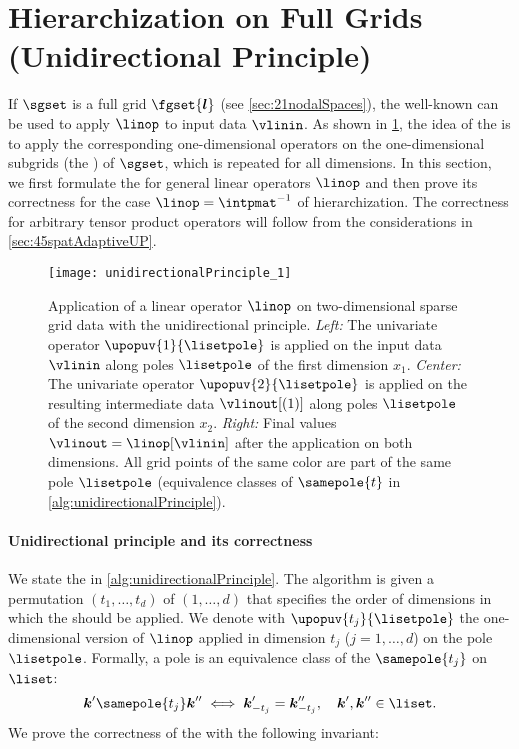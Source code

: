 \section{Hierarchization on Full Grids (Unidirectional Principle)}
\label{sec:42fullGrids}

If $\sgset$ is a full grid $\fgset{\*l}$
(see \cref{sec:21nodalSpaces}),
the well-known \up
can be used to apply $\linop$ to input data $\vlinin$.
As shown in \cref{fig:unidirectionalPrinciple}, the idea of the \up
is to apply the corresponding one-dimensional operators on the
one-dimensional subgrids (the ) of $\sgset$,
which is repeated for all dimensions.
In this section, we first formulate the \up for
general linear operators $\linop$ and then prove its correctness for
the case $\linop = \intpmatinv$ of hierarchization.
The correctness for arbitrary tensor product operators
will follow from the considerations in \cref{sec:45spatAdaptiveUP}.

\begin{figure}
  \texttt{[image: unidirectionalPrinciple\_1]}%
  \caption[%
    Unidirectional principle%
  ]{%
    Application of a linear operator $\linop$
    on two-dimensional sparse grid data with the unidirectional principle.
    \emph{Left:}
    The univariate operator $\upopuv{1}{\lisetpole}$ is applied on
    the input data $\vlinin$
    along poles $\lisetpole$ of the first dimension $x_1$.
    \vspace{-0.2em}%
    \emph{Center:}
    The univariate operator $\upopuv{2}{\lisetpole}$ is applied on the
    resulting intermediate data $\vlinout[(1)]$
    along poles $\lisetpole$ of the second dimension $x_2$.
    \emph{Right:}
    Final values $\vlinout = \linop[\vlinin]$ after the application
    on both dimensions.
    All grid points of the same color are part of the same pole $\lisetpole$
    (equivalence classes of $\samepole{t}$ in
    \cref{alg:unidirectionalPrinciple}).%
  }%
  \label{fig:unidirectionalPrinciple}%
\end{figure}

\paragraph{Unidirectional principle and its correctness}

We state the \up in \cref{alg:unidirectionalPrinciple}.
The algorithm is given a permutation $(t_1, \dotsc, t_d)$ of $(1, \dotsc, d)$
that specifies the order of dimensions in which the \up should be applied.
We denote with $\upopuv{t_j}{\lisetpole}$ the one-dimensional version of $\linop$
applied in dimension $t_j$ ($j = 1, \dotsc, d$) on the pole $\lisetpole$.
Formally, a pole is an equivalence class of the
 $\samepole{t_j}$ on $\liset$:
\begin{equation}
  \label{eq:poleEquivalenceRelation}
  \*k' \samepole{t_j} \*k'' \iff \*k'_{-t_j} = \*k''_{-t_j},\quad
  \*k', \*k'' \in \liset.
\end{equation}
We prove the correctness of the \up with the following invariant:

